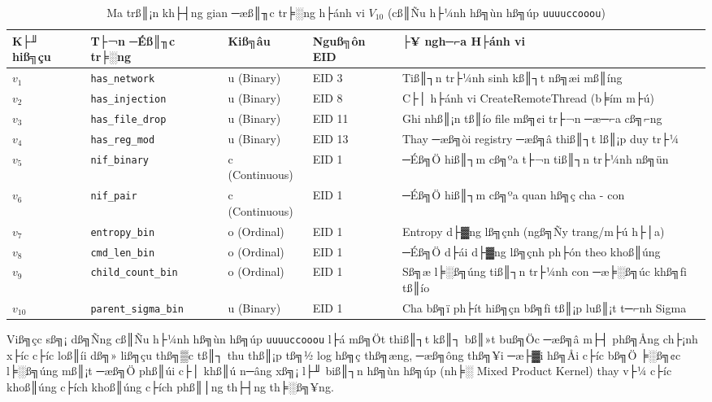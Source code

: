 ﻿\documentclass[../main.tex]{subfiles}
\begin{document}
\begin{table}[H]
\centering
\small
\setlength{\tabcolsep}{4pt}
\caption{Ma trß║¡n kh├┤ng gian ─æß║╖c tr╞░ng h├ánh vi $V_{10}$ (cß║Ñu h├¼nh hß╗ùn hß╗úp \texttt{uuuuccooou})}
\label{tab:v10_space}
\begin{tabular}{|>{\centering\arraybackslash}p{1.0cm}|p{4.0cm}|p{1.8cm}|p{1.8cm}|p{4.6cm}|}
\hline
\textbf{K├╜ hiß╗çu} & \textbf{T├¬n ─Éß║╖c tr╞░ng} & \textbf{Kiß╗âu} & \textbf{Nguß╗ôn EID} & \textbf{├¥ ngh─⌐a H├ánh vi} \\ \hline
$v_1$ & \texttt{has\_network} & u (Binary) & EID 3 & Tiß║┐n tr├¼nh sinh kß║┐t nß╗æi mß║íng \\ \hline
$v_2$ & \texttt{has\_injection} & u (Binary) & EID 8 & C├│ h├ánh vi CreateRemoteThread (b╞ím m├ú) \\ \hline
$v_3$ & \texttt{has\_file\_drop} & u (Binary) & EID 11 & Ghi nhß║¡n tß║ío file mß╗¢i tr├¬n ─æ─⌐a cß╗⌐ng \\ \hline
$v_4$ & \texttt{has\_reg\_mod} & u (Binary) & EID 13 & Thay ─æß╗òi registry ─æß╗â thiß║┐t lß║¡p duy tr├¼ \\ \hline
$v_5$ & \texttt{nif\_binary} & c (Continuous) & EID 1 & ─Éß╗Ö hiß║┐m cß╗ºa t├¬n tiß║┐n tr├¼nh nß╗ün \\ \hline
$v_6$ & \texttt{nif\_pair} & c (Continuous) & EID 1 & ─Éß╗Ö hiß║┐m cß╗ºa quan hß╗ç cha - con \\ \hline
$v_7$ & \texttt{entropy\_bin} & o (Ordinal) & EID 1 & Entropy d├▓ng lß╗çnh (ngß╗Ñy trang/m├ú h├│a) \\ \hline
$v_8$ & \texttt{cmd\_len\_bin} & o (Ordinal) & EID 1 & ─Éß╗Ö d├ái d├▓ng lß╗çnh ph├ón theo khoß║úng \\ \hline
$v_9$ & \texttt{child\_count\_bin} & o (Ordinal) & EID 1 & Sß╗æ l╞░ß╗úng tiß║┐n tr├¼nh con ─æ╞░ß╗úc khß╗ƒi tß║ío \\ \hline
$v_{10}$ & \texttt{parent\_sigma\_bin} & u (Binary) & EID 1 & Cha bß╗ï ph├ít hiß╗çn bß╗ƒi tß║¡p luß║¡t t─⌐nh Sigma \\ \hline
\end{tabular}
\end{table}

Viß╗çc sß╗¡ dß╗Ñng cß║Ñu h├¼nh hß╗ùn hß╗úp \texttt{uuuuccooou} l├á mß╗Öt thiß║┐t kß║┐ bß║»t buß╗Öc ─æß╗â m├┤ phß╗Ång ch├¡nh x├íc c├íc loß║íi dß╗» liß╗çu thß╗▒c tß║┐ thu thß║¡p tß╗½ log hß╗ç thß╗æng, ─æß╗ông thß╗¥i ─æ├▓i hß╗Åi c├íc bß╗Ö ╞░ß╗¢c l╞░ß╗úng mß║¡t ─æß╗Ö phß║úi c├│ khß║ú n─âng xß╗¡ l├╜ biß║┐n hß╗ùn hß╗úp (nh╞░ Mixed Product Kernel) thay v├¼ c├íc khoß║úng c├ích khoß║úng c├ích phß║│ng th├┤ng th╞░ß╗¥ng.
\end{document}
